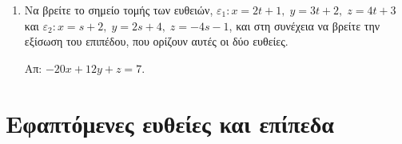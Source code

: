 \begin{enumerate}
  \item Να βρείτε το σημείο τομής των ευθειών, $ \varepsilon _{1}: x=2t+1, \; y=3t+2, \;
    z=4t+3$ και $ \varepsilon _{2}: x=s+2, \; y=2s+4, \; z=-4s-1 $, και στη συνέχεια να 
    βρείτε την εξίσωση του επιπέδου, που ορίζουν αυτές οι δύο ευθείες.

    \hfill Απ: $ -20x+12y+z=7 $. 
    
\end{enumerate}


\section*{Εφαπτόμενες ευθείες και επίπεδα}

